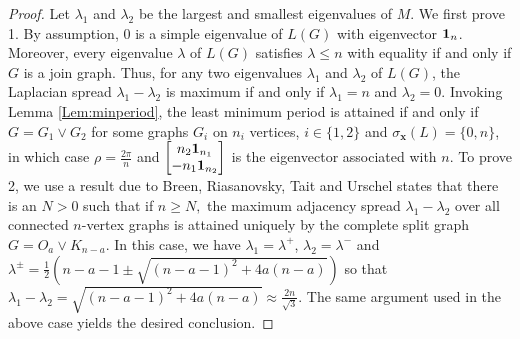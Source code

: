 \documentclass[11pt]{article}
\newcommand{\ones}{{\bf{1}}}
\newcommand{\bx}{\mathbf x}
\begin{document}
\begin{proof}
Let $\lambda_1$ and $\lambda_2$ be the largest and smallest eigenvalues of $M$. We first prove 1. By assumption, $0$ is a simple eigenvalue of $L(G)$ with eigenvector $\ones_n$. Moreover, every eigenvalue $\lambda$ of $L(G)$ satisfies $\lambda\leq n$ with equality if and only if $G$ is a join graph. Thus, for any two eigenvalues $\lambda_1$ and $\lambda_2$ of $L(G)$, the Laplacian spread $\lambda_1-\lambda_2$ is maximum if and only if $\lambda_1=n$ and $\lambda_2=0$. 
Invoking Lemma \ref{Lem:minperiod}, the least minimum period is attained if and only if $G=G_1\vee G_2$ for some graphs $G_i$ on $n_i$ vertices, $i\in\{1,2\}$ and $\sigma_{\bx}(L)=\{0,n\}$, in which case $\rho=\frac{2\pi}{n}$ and $\begin{bmatrix}
n_2\ones_{n_1} \\ -n_1\ones_{n_2}
\end{bmatrix}$ is the eigenvector associated with $n$. To prove 2, we use a result due to Breen, Riasanovsky, Tait and Urschel \cite{BRTU} states that there is an $N>0$ such that if $n\ge N,$ the maximum adjacency spread $\lambda_1-\lambda_2$ over all connected $n$-vertex graphs is attained uniquely by the complete split graph $G=O_a\vee K_{n-a}.$ In this case, we have $\lambda_1=\lambda^+$, $\lambda_2=\lambda^-$ and $\lambda^{\pm}=\frac{1}{2}(n-a-1\pm\sqrt{(n-a-1)^2+4a(n-a)})$ so that $\lambda_{1}-\lambda_{2}=\sqrt{(n-a-1)^2+4a(n-a)} \approx \frac{2n}{\sqrt{3}}.$ The same argument used in the above case yields the desired conclusion.
\end{proof}
\end{document}
